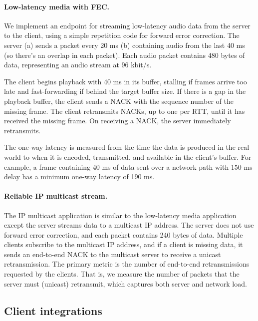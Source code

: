 \paragraph{Low-latency media with FEC.}

We implement an endpoint for streaming low-latency audio data from the server
to the client, using a simple repetition code for forward error correction.
The server (a) sends a packet every 20 ms
(b) containing audio from the last 40 ms (so there's an overlap in each
packet). Each audio packet contains 480 bytes of data, representing an audio
stream at 96 kbit/s.

The client begins playback with 40 ms in its buffer, stalling if frames arrive
too late and fast-forwarding if behind the target buffer size.
If there is a gap in the
playback buffer, the client sends a NACK with the sequence number of the
missing frame. The client retransmits NACKs, up to one per RTT, until it has
received the missing frame. On receiving a NACK, the server immediately
retransmits.

The one-way latency is measured from the time the data is produced in the real
world to when it is encoded, transmitted, and available in the client's
buffer. For example, a frame containing 40 ms of data sent over a network path
with 150 ms delay has a minimum one-way latency of 190 ms.

\paragraph{Reliable IP multicast stream.}

The IP multicast application is similar to the low-latency media application
except the server streams data to a multicast IP address. The server does not
use forward error correction, and each packet contains 240 bytes of data. Multiple clients
subscribe to the multicast IP address, and if a client is missing data,
it sends an end-to-end NACK to the
multicast server to receive a unicast retransmission.
The primary metric is the number of end-to-end retransmissions requested by
the clients. That is, we measure the number of packets that the server
must (unicast) retransmit, which captures both server and network load.

\subsection{Client integrations}
\label{sec:packrat:implementation:client-integrations}

